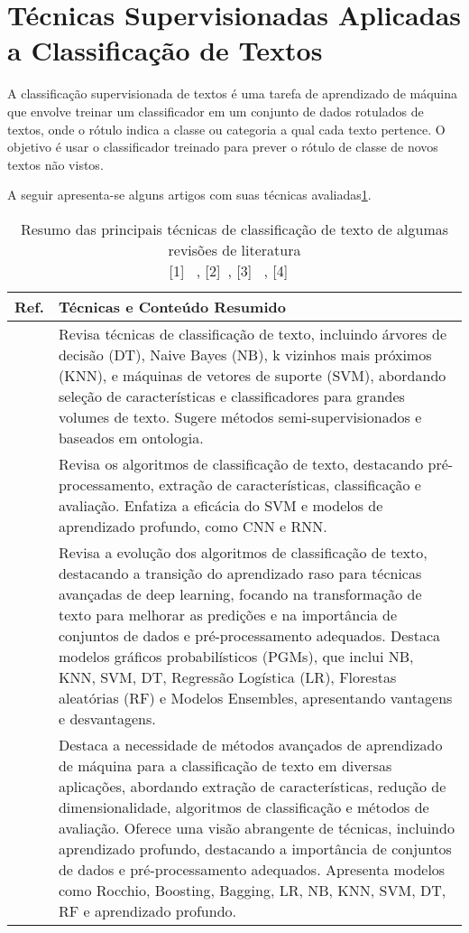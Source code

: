 \section{Técnicas Supervisionadas Aplicadas a Classificação de Textos}

A classificação supervisionada de textos é uma tarefa de aprendizado de máquina que envolve treinar um classificador em um conjunto de dados rotulados de textos, onde o rótulo indica a classe ou categoria a qual cada texto pertence. O objetivo é usar o classificador treinado para prever o rótulo de classe de novos textos não vistos.

A seguir apresenta-se alguns artigos com suas técnicas avaliadas\ref{tab:ml_techniques}.

\begin{table}[h]
\centering
\caption{Resumo das principais técnicas de classificação de texto de algumas revisões de literatura \\ \footnotesize{[1] ~\cite{aggarwal2018review}, [2]~\cite{bhavani2021review}, [3] ~\cite{gasparetto2022survey}, [4] ~\cite{kowsari2019text}}}

\label{tab:ml_techniques}
\begin{tabularx}{\textwidth}{c|>{\small}X}
\hline
\textbf{Ref.} & \textbf{Técnicas e Conteúdo Resumido} \\
\hline
[1] & Revisa técnicas de classificação de texto, incluindo árvores de decisão (DT), Naive Bayes (NB), k vizinhos mais próximos (KNN), e máquinas de vetores de suporte (SVM), abordando seleção de características e classificadores para grandes volumes de texto. Sugere métodos semi-supervisionados e baseados em ontologia. \\
\hline
[2] & Revisa os algoritmos de classificação de texto, destacando pré-processamento, extração de características, classificação e avaliação. Enfatiza a eficácia do SVM e modelos de aprendizado profundo, como CNN e RNN. \\
\hline
[3] & Revisa a evolução dos algoritmos de classificação de texto, destacando a transição do aprendizado raso para técnicas avançadas de deep learning, focando na transformação de texto para melhorar as predições e na importância de conjuntos de dados e pré-processamento adequados. Destaca modelos gráficos probabilísticos (PGMs), que inclui NB, KNN, SVM, DT, Regressão Logística (LR), Florestas aleatórias (RF) e Modelos Ensembles, apresentando vantagens e desvantagens. \\
\hline
[4] & Destaca a necessidade de métodos avançados de aprendizado de máquina para a classificação de texto em diversas aplicações, abordando extração de características, redução de dimensionalidade, algoritmos de classificação e métodos de avaliação. Oferece uma visão abrangente de técnicas, incluindo aprendizado profundo, destacando a importância de conjuntos de dados e pré-processamento adequados. Apresenta modelos como Rocchio, Boosting, Bagging, LR, NB, KNN, SVM, DT, RF e aprendizado profundo. \\
\hline
\end{tabularx}
\end{table}

